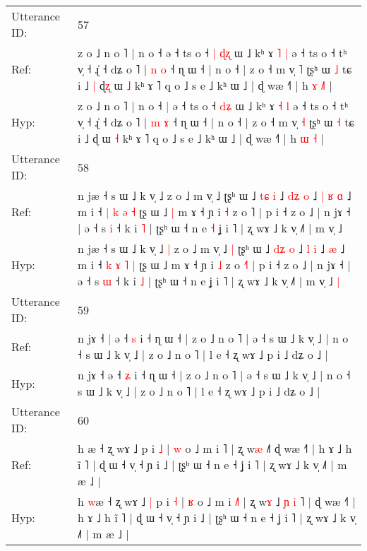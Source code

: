 \documentclass[10pt]{article}
\DeclareRobustCommand{\hl}[1]{{\textcolor{red}{#1}}}
\begin{document}
\begin{longtable}{ll}
 \\
\midrule
Utterance ID: & 57 \\
Ref: & z o ˩ n o ˥ | n o ˧\hl{}\hl{} ə ˧ ts o ˧\hl{ }\hl{|} \hl{ɖ}\hl{ʐ} ɯ ˩ kʰ ɤ \hl{˥} \hl{|} ə ˧ ts o ˧ tʰ v̩ ˧ ɻ̍ ˧ dʑ o ˥ | \hl{n} \hl{o} ˧ ɳ ɯ ˧ | n o ˧ | z o ˧ m v̩ \hl{˥} ʈʂʰ ɯ \hl{˩} tɕ i ˩\hl{ }\hl{|} ɖ\hl{ʐ} ɯ \hl{˩} kʰ ɤ ˥ q o ˩ s e ˩ kʰ ɯ ˩ | ɖ wæ ˧˥ | h \hl{ɤ} \hl{˩}\hl{˥} |
 \\
Hyp: & z o ˩ n o ˥ | n o ˧\hl{ }\hl{|} ə ˧ ts o ˧\hl{}\hl{} \hl{d}\hl{ʑ} ɯ ˩ kʰ ɤ \hl{˧} \hl{l} ə ˧ ts o ˧ tʰ v̩ ˧ ɻ̍ ˧ dʑ o ˥ | \hl{m} \hl{ɤ} ˧ ɳ ɯ ˧ | n o ˧ | z o ˧ m v̩ \hl{˧} ʈʂʰ ɯ \hl{˧} tɕ i ˩\hl{}\hl{} ɖ\hl{} ɯ \hl{˧} kʰ ɤ ˥ q o ˩ s e ˩ kʰ ɯ ˩ | ɖ wæ ˧˥ | h \hl{ɯ} \hl{}\hl{˧} |
 \\
\midrule
Utterance ID: & 58 \\
Ref: & n jæ ˧ s ɯ ˩ k v̩ ˩\hl{}\hl{} z o ˩ m v̩ ˩\hl{}\hl{} ʈʂʰ ɯ ˩ \hl{t}\hl{ɕ} \hl{i} ˩ \hl{d}\hl{ʑ} \hl{o} ˩\hl{ }\hl{|}\hl{ }\hl{ʁ} \hl{ɑ} ˩ m i ˧ \hl{|} \hl{k} \hl{ə} \hl{˧} ʈʂ ɯ ˩\hl{ }\hl{|} m ɤ ˧ ɲ i \hl{˧} z o \hl{}˥ | p i ˧ z o ˩ | n jɤ ˧ | ə ˧ s \hl{i} ˧ k i \hl{˥} | ʈʂʰ ɯ ˧ n e\hl{ }\hl{˧} ʝ i ˥ | ʐ wɤ ˩ k v̩ ˩˥ | m v̩ ˩\hl{}\hl{}
 \\
Hyp: & n jæ ˧ s ɯ ˩ k v̩ ˩\hl{ }\hl{|} z o ˩ m v̩ ˩\hl{ }\hl{|} ʈʂʰ ɯ ˩ \hl{d}\hl{ʑ} \hl{o} ˩ \hl{}\hl{l} \hl{i} ˩\hl{}\hl{}\hl{}\hl{} \hl{æ} ˩ m i ˧ \hl{k} \hl{ɤ} \hl{˥} \hl{|} ʈʂ ɯ ˩\hl{}\hl{} m ɤ ˧ ɲ i \hl{˩} z o \hl{˧}˥ | p i ˧ z o ˩ | n jɤ ˧ | ə ˧ s \hl{ɯ} ˧ k i \hl{˩} | ʈʂʰ ɯ ˧ n e\hl{}\hl{} ʝ i ˥ | ʐ wɤ ˩ k v̩ ˩˥ | m v̩ ˩\hl{ }\hl{|}
 \\
\midrule
Utterance ID: & 59 \\
Ref: & n jɤ ˧\hl{ }\hl{|} ə ˧ \hl{s} i ˧ ɳ ɯ ˧ | z o ˩ n o ˥ | ə ˧ s ɯ ˩ k v̩ ˩ | n o ˧ s ɯ ˩ k v̩ ˩ | z o ˩ n o ˥ | l e ˧ ʐ wɤ ˩ p i ˩ dʑ o ˩ |
 \\
Hyp: & n jɤ ˧\hl{}\hl{} ə ˧ \hl{ʑ} i ˧ ɳ ɯ ˧ | z o ˩ n o ˥ | ə ˧ s ɯ ˩ k v̩ ˩ | n o ˧ s ɯ ˩ k v̩ ˩ | z o ˩ n o ˥ | l e ˧ ʐ wɤ ˩ p i ˩ dʑ o ˩ |
 \\
\midrule
Utterance ID: & 60 \\
Ref: & h \hl{}æ ˧ ʐ wɤ ˩\hl{}\hl{} p i \hl{˩} | \hl{w} o ˩ m i \hl{}˥ | ʐ w\hl{æ} ˩\hl{}\hl{}\hl{}\hl{}\hl{}˥\hl{}\hl{} ɖ wæ ˧˥ | h ɤ ˩ h ĩ ˥ | ɖ ɯ ˧ v̩ ˧ ɲ i ˩ | ʈʂʰ ɯ ˧ n e ˧ ʝ i ˥ | ʐ wɤ ˩ k v̩ ˩˥ | m æ ˩ |
 \\
Hyp: & h \hl{w}æ ˧ ʐ wɤ ˩\hl{ }\hl{|} p i \hl{˧} | \hl{ʁ} o ˩ m i \hl{˩}˥ | ʐ w\hl{ɤ} ˩\hl{ }\hl{ɲ}\hl{ }\hl{i}\hl{ }˥\hl{ }\hl{|} ɖ wæ ˧˥ | h ɤ ˩ h ĩ ˥ | ɖ ɯ ˧ v̩ ˧ ɲ i ˩ | ʈʂʰ ɯ ˧ n e ˧ ʝ i ˥ | ʐ wɤ ˩ k v̩ ˩˥ | m æ ˩ |

\end{longtable}
\end{document}
